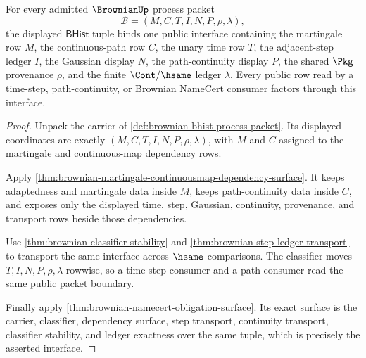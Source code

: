\begin{theorem}
\label{thm:brownian-time-step-path-interface}
For every admitted $\BrownianUp$ process packet
$$
\mathcal{B}=(M,C,T,I,N,P,\rho,\lambda),
$$
the displayed $\mathsf{BHist}$ tuple binds one public interface containing the
martingale row $M$, the continuous-path row $C$, the unary time row $T$, the
adjacent-step ledger $I$, the Gaussian display $N$, the path-continuity display
$P$, the shared $\Pkg$ provenance $\rho$, and the finite $\Cont/\hsame$ ledger
$\lambda$. Every public row read by a time-step, path-continuity, or Brownian
NameCert consumer factors through this interface.
\end{theorem}
\begin{proof}
Unpack the carrier of \autoref{def:brownian-bhist-process-packet}. Its displayed
coordinates are exactly $(M,C,T,I,N,P,\rho,\lambda)$, with $M$ and $C$ assigned
to the martingale and continuous-map dependency rows.

Apply \autoref{thm:brownian-martingale-continuousmap-dependency-surface}. It
keeps adaptedness and martingale data inside $M$, keeps path-continuity data
inside $C$, and exposes only the displayed time, step, Gaussian, continuity,
provenance, and transport rows beside those dependencies.

Use \autoref{thm:brownian-classifier-stability} and
\autoref{thm:brownian-step-ledger-transport} to transport the same interface
across $\hsame$ comparisons. The classifier moves $T,I,N,P,\rho,\lambda$
rowwise, so a time-step consumer and a path consumer read the same public
packet boundary.

Finally apply \autoref{thm:brownian-namecert-obligation-surface}. Its exact
surface is the carrier, classifier, dependency surface, step transport,
continuity transport, classifier stability, and ledger exactness over the same
tuple, which is precisely the asserted interface.
\end{proof}

